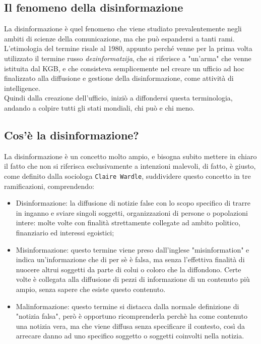 \documentclass{article}
\begin{document}
\begin{center}
\newpage \section{Il fenomeno della disinformazione}
\end{center}
\begin{justify}
    La disinformazione è quel fenomeno che viene studiato prevalentemente negli ambiti di scienze della comunicazione, ma che può espandersi a tanti rami.
    L'etimologia del termine risale al 1980, appunto perché venne per la prima volta utilizzato il termine russo \textit{dezinformatzija}, che si riferisce a "un'arma" che venne istituita dal KGB, e che consisteva semplicemente nel creare un ufficio ad hoc finalizzato alla diffusione e gestione della disinformazione, come attività di intelligence.\citep{DisWiki}\\
    Quindi dalla creazione dell'ufficio, iniziò a diffondersi questa terminologia, andando a colpire tutti gli stati mondiali, chi può e chi meno.
\end{justify}

\flushleft \subsection{Cos'è la disinformazione?}
\begin{justify}
    La disinformazione è un concetto molto ampio, e bisogna subito mettere in chiaro il fatto che non si riferisca esclusivamente a intenzioni malevoli, di fatto, è giusto, come definito dalla sociologa \texttt{Claire Wardle}, suddividere questo concetto in tre ramificazioni, comprendendo:
\begin{itemize}
    \item Disinformazione: la diffusione di notizie false con lo scopo specifico di trarre in inganno e sviare singoli soggetti, organizzazioni di persone o popolazioni intere: molte volte con finalità strettamente collegate ad ambito politico, finanziario ed interessi egoistici;
    \item Misinformazione: questo termine viene preso dall'inglese "misinformation" e indica un'informazione che di per sè è falsa, ma senza l'effettiva finalità di nuocere altrui soggetti da parte di colui o coloro che la diffondono. Certe volte è collegata alla diffusione di pezzi di informazione di un contenuto più ampio, senza sapere che esiste questo contenuto.
    \item Malinformazione: questo termine si distacca dalla normale definizione di "notizia falsa", però è opportuno ricomprenderla perchè ha come contenuto una notizia vera, ma che viene diffusa senza specificare il contesto, così da arrecare danno ad uno specifico soggetto o soggetti coinvolti nella notizia. \citep{wardle2018information}
\end{itemize}
\end{justify}
\end{document}
